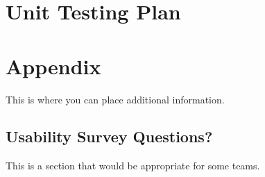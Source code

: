 \documentclass[12pt, titlepage]{article}
\begin{document}
					
					
					
					
					

					
					
					
					



				
\section{Unit Testing Plan}
		

%

%

\newpage

\section{Appendix}

This is where you can place additional information.


\subsection{Usability Survey Questions?}

This is a section that would be appropriate for some teams.
\end{document}
